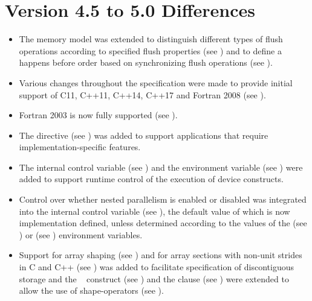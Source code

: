 \section{Version 4.5 to 5.0 Differences}
\label{sec:Version 4.5 to 5.0 Differences}
\begin{itemize}
\item The memory model was extended to distinguish different types of flush
      operations according to specified flush properties (see
      ) and to define a happens
      before order based on synchronizing flush operations
      (see ).

\item Various changes throughout the specification were made to provide
      initial support of C11, C++11, C++14, C++17 and Fortran 2008 (see
      ).

\item Fortran 2003 is now fully supported (see
      ).

\item The  directive (see ) was
      added to support applications that require implementation-specific
      features.

\item The  internal control variable (see
      ) and the
       environment variable (see
      ) were added to support runtime
      control of the execution of device constructs.

\item Control over whether nested parallelism is enabled or disabled was
      integrated into the  internal control variable
      (see ), the default value of which is
      now implementation defined, unless determined according to the values of
      the  (see ) or
       (see ) environment
      variables.

\item Support for array shaping (see ) and
      for array sections with non-unit strides  in C and C++ (see 
      ) was added to facilitate specification
      of discontiguous storage and the ~ construct (see 
      ) and the  clause 
      (see ) were extended to allow the use 
      of shape-operators (see ).


\end{itemize}
